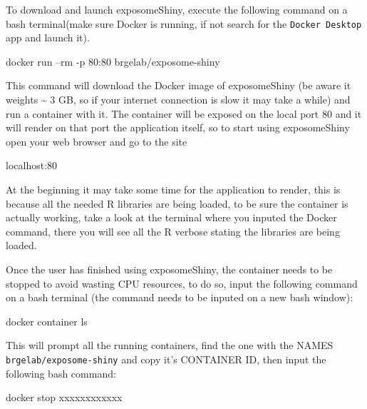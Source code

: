 \documentclass[
]{book}
\newenvironment{Shaded}{\begin{snugshade}}{\end{snugshade}}
\newcommand{\ExtensionTok}[1]{#1}
\newcommand{\NormalTok}[1]{#1}
\begin{document}
To download and launch exposomeShiny, execute the following command on a bash terminal(make sure Docker is running, if not search for the \texttt{Docker\ Desktop} app and launch it).

\begin{Shaded}
\begin{Highlighting}[]
\ExtensionTok{docker}\NormalTok{ run --rm -p 80:80 brgelab/exposome-shiny}
\end{Highlighting}
\end{Shaded}

This command will download the Docker image of exposomeShiny (be aware it weights \textasciitilde{} 3 GB, so if your internet connection is slow it may take a while) and run a container with it. The container will be exposed on the local port 80 and it will render on that port the application itself, so to start using exposomeShiny open your web browser and go to the site

\begin{Shaded}
\begin{Highlighting}[]
\ExtensionTok{localhost}\NormalTok{:80}
\end{Highlighting}
\end{Shaded}

At the beginning it may take some time for the application to render, this is because all the needed R libraries are being loaded, to be sure the container is actually working, take a look at the terminal where you inputed the Docker command, there you will see all the R verbose stating the libraries are being loaded.

Once the user has finished using exposomeShiny, the container needs to be stopped to avoid wasting CPU resources, to do so, input the following command on a bash terminal (the command needs to be inputed on a new bash window):

\begin{Shaded}
\begin{Highlighting}[]
\ExtensionTok{docker}\NormalTok{ container ls}
\end{Highlighting}
\end{Shaded}

This will prompt all the running containers, find the one with the NAMES \texttt{brgelab/exposome-shiny} and copy it's CONTAINER ID, then input the following bash command:

\begin{Shaded}
\begin{Highlighting}[]
\ExtensionTok{docker}\NormalTok{ stop xxxxxxxxxxxx}
\end{Highlighting}
\end{Shaded}
\end{document}
